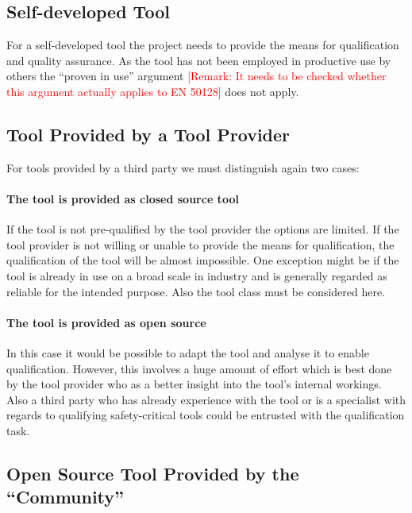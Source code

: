 \subsection{Self-developed Tool}

For a self-developed tool the project needs to provide the means for qualification and quality assurance. As the tool has not been employed in productive use by others the ``proven in use'' argument \textcolor{red}{[Remark: It needs to be checked whether this argument actually applies to EN 50128]} does not apply.

\subsection{Tool Provided by a Tool Provider}

For tools provided by a third party we must distinguish again two cases:

\paragraph{The tool is provided as closed source tool}

If the tool is not pre-qualified by the tool provider the options are limited. If the tool provider is not willing or unable to provide the means for qualification, the qualification of the tool will be almost impossible. One exception might be if the tool is already in use on a broad scale in industry and is generally regarded as reliable for the intended purpose. Also the tool class must be considered here.

\paragraph{The tool is provided as open source}

In this case it would be possible to adapt the tool and analyse it to enable qualification. However, this involves a huge amount of effort which is best done by the tool provider who as a better insight into the tool's internal workings. Also a third party who has already experience with the tool or is a specialist with regards to qualifying safety-critical tools could be entrusted with the qualification task.

\subsection{Open Source Tool Provided by the ``Community''}

